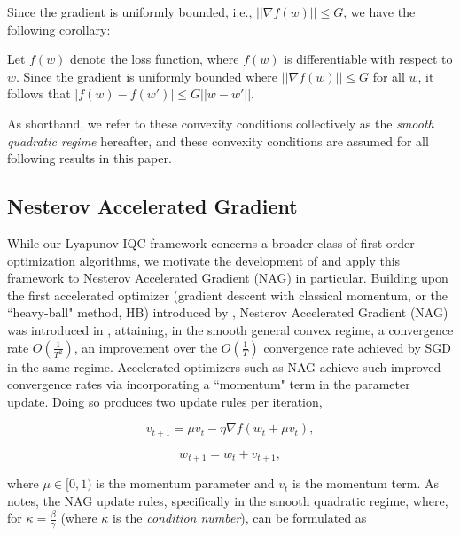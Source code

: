 \documentclass[twoside,11pt]{article}
\begin{document}
\noindent
Since the gradient is uniformly bounded, i.e., $||\nabla f(w)|| \leq G$, we have the following corollary:

\begin{corollary}
Let $f(w)$ denote the loss function, where $f(w)$ is differentiable with respect to $w$. Since the gradient is uniformly bounded where  $||\nabla f(w)|| \leq G$ for all $w$, it follows that $|f(w) - f(w')| \leq G||w - w'||$.
\end{corollary}

\noindent
As shorthand, we refer to these convexity conditions collectively as the \textit{smooth quadratic regime} hereafter, and these convexity conditions are assumed for all following results in this paper.

\subsection{Nesterov Accelerated Gradient}

While our Lyapunov-IQC framework concerns a broader class of first-order optimization algorithms, we motivate the development of and apply this framework to Nesterov Accelerated Gradient (NAG) in particular. Building upon the first accelerated optimizer (gradient descent with classical momentum, or the ``heavy-ball" method, HB) introduced by \cite{Pol64}, Nesterov Accelerated Gradient (NAG) was introduced in \cite{Nes83}, attaining, in the smooth general convex regime, a convergence rate $O(\frac{1}{T^2})$, an improvement over the $O(\frac{1}{T})$ convergence rate achieved by SGD in the same regime. Accelerated optimizers such as NAG achieve such improved convergence rates via incorporating a ``momentum" term in the parameter update. Doing so produces two update rules per iteration,

\begin{equation}
v_{t+1} = \mu v_t - \eta \nabla f(w_t + \mu v_t),
\end{equation}

\begin{equation}
w_{t+1} = w_t + v_{t+1},
\end{equation}

\noindent
where $\mu \in [0,1)$ is the momentum parameter and $v_t$ is the momentum term. As \cite{Bub15} notes, the NAG update rules, specifically in the smooth quadratic regime, where, for $\kappa = \frac{\beta}{\gamma}$ (where $\kappa$ is the \textit{condition number}), can be formulated as
\end{document}
